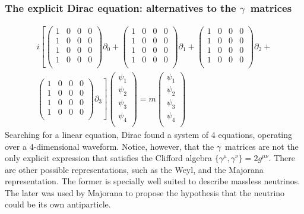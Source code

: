 \begin{frame}
\frametitle{The explicit Dirac equation: alternatives to the $\gamma$~matrices}

\[
\begin{split}
 i \left[
\left( \begin{array}{cccc}
1 & 0 & 0 &0 \\
1 & 0 & 0 &0 \\
1 & 0 & 0 &0 \\
1 & 0 & 0 &0 \\
\end{array} \right ) \partial_0 +  
\left( \begin{array}{cccc}
1 & 0 & 0 &0 \\
1 & 0 & 0 &0 \\
1 & 0 & 0 &0 \\
1 & 0 & 0 &0 \\
\end{array} \right ) \partial_1 + 
 \left( \begin{array}{cccc}
1 & 0 & 0 &0 \\
1 & 0 & 0 &0 \\
1 & 0 & 0 &0 \\
1 & 0 & 0 &0 \\
\end{array} \right ) \partial_2   +  \right. \\
\left. \left( \begin{array}{cccc}
1 & 0 & 0 &0 \\
1 & 0 & 0 &0 \\
1 & 0 & 0 &0 \\
1 & 0 & 0 &0 \\
\end{array} \right ) \partial_3 
\right] \left( \begin{array}{c}
\psi_1 \\
\psi_2 \\
\psi_3 \\
\psi_4 \\
\end{array} \right )  = m \left( \begin{array}{c}
\psi_1 \\
\psi_2 \\
\psi_3 \\
\psi_4 \\
\end{array} \right )
\end{split}
\]
Searching for a linear equation, Dirac found a system of 4 equations, operating over a 4-dimensional waveform. Notice, however, that the $\gamma$~matrices are not the only explicit expression that satisfies the Clifford algebra $\{\gamma^\mu, \gamma^\nu\} = 2 g^{\mu\nu}$. There are other possible representations, such as the Weyl, and the Majorana representation. The former is specially well suited to describe massless neutrinos. The later was used by Majorana to propose the hypothesis that the neutrino could be its own antiparticle. 
\end{frame}
